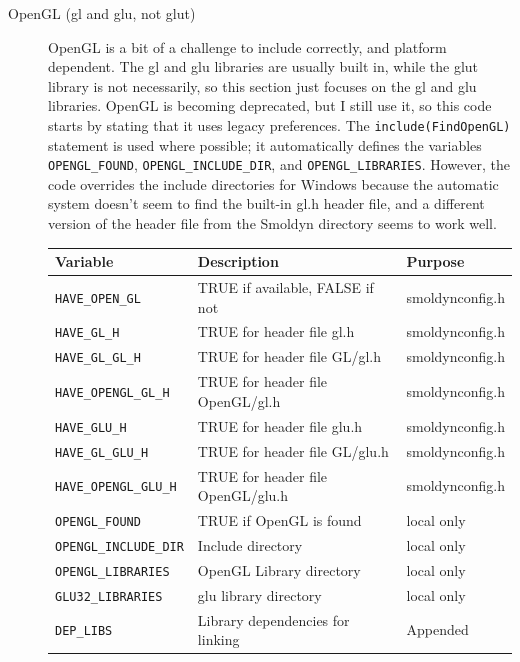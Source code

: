 \documentclass {scrbook}
\newcommand {\ttt} {\texttt}
\begin{document}
\begin{description}
\item[OpenGL (gl and glu, not glut)]
OpenGL is a bit of a challenge to include correctly, and platform dependent. The gl and glu libraries are usually built in, while the glut library is not necessarily, so this section just focuses on the gl and glu libraries. OpenGL is becoming deprecated, but I still use it, so this code starts by stating that it uses legacy preferences. The \ttt{include(FindOpenGL)} statement is used where possible; it automatically defines the variables \ttt{OPENGL\_FOUND}, \ttt{OPENGL\_INCLUDE\_DIR}, and \ttt{OPENGL\_LIBRARIES}. However, the code overrides the include directories for Windows because the automatic system doesn't seem to find the built-in gl.h header file, and a different version of the header file from the Smoldyn directory seems to work well.
\begin{longtable}[c]{lll}
Variable & Description & Purpose\\
\hline
\ttt{HAVE\_OPEN\_GL} & TRUE if available, FALSE if not & smoldynconfig.h\\
\ttt{HAVE\_GL\_H} & TRUE for header file gl.h  & smoldynconfig.h\\
\ttt{HAVE\_GL\_GL\_H} & TRUE for header file GL/gl.h  & smoldynconfig.h\\
\ttt{HAVE\_OPENGL\_GL\_H} & TRUE for header file OpenGL/gl.h  & smoldynconfig.h\\
\ttt{HAVE\_GLU\_H} & TRUE for header file glu.h  & smoldynconfig.h\\
\ttt{HAVE\_GL\_GLU\_H} & TRUE for header file GL/glu.h  & smoldynconfig.h\\
\ttt{HAVE\_OPENGL\_GLU\_H} & TRUE for header file OpenGL/glu.h  & smoldynconfig.h\\
\ttt{OPENGL\_FOUND} & TRUE if OpenGL is found & local only\\
\ttt{OPENGL\_INCLUDE\_DIR} & Include directory & local only\\
\ttt{OPENGL\_LIBRARIES} & OpenGL Library directory & local only\\
\ttt{GLU32\_LIBRARIES} & glu library directory & local only\\
\ttt{DEP\_LIBS} & Library dependencies for linking & Appended\\
\end{longtable}


\end{description}
\end{document}
